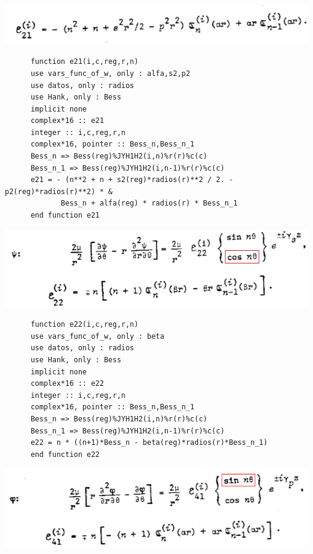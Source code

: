\documentclass [11pt,spanish]{article}
\begin{document}
\includegraphics[scale=0.5]{e21b}
\begingroup
\fontsize{10pt}{12pt}
\selectfont
{}
\begin{shaded}
\begin{verbatim}
      function e21(i,c,reg,r,n)
      use vars_func_of_w, only : alfa,s2,p2
      use datos, only : radios
      use Hank, only : Bess
      implicit none
      complex*16 :: e21
      integer :: i,c,reg,r,n
      complex*16, pointer :: Bess_n,Bess_n_1
      Bess_n => Bess(reg)%JYH1H2(i,n)%r(r)%c(c)
      Bess_n_1 => Bess(reg)%JYH1H2(i,n-1)%r(r)%c(c)
      e21 = - (n**2 + n + s2(reg)*radios(r)**2 / 2. - p2(reg)*radios(r)**2) * &
             Bess_n + alfa(reg) * radios(r) * Bess_n_1
      end function e21
\end{verbatim}
\end{shaded}
\endgroup
\includegraphics[scale=0.5]{e22}
\begingroup
\fontsize{10pt}{12pt}
\selectfont
{}
\begin{shaded}
\begin{verbatim}
      function e22(i,c,reg,r,n)
      use vars_func_of_w, only : beta
      use datos, only : radios
      use Hank, only : Bess
      implicit none
      complex*16 :: e22
      integer :: i,c,reg,r,n
      complex*16, pointer :: Bess_n,Bess_n_1
      Bess_n => Bess(reg)%JYH1H2(i,n)%r(r)%c(c)
      Bess_n_1 => Bess(reg)%JYH1H2(i,n-1)%r(r)%c(c)
      e22 = n * ((n+1)*Bess_n - beta(reg)*radios(r)*Bess_n_1)
      end function e22
\end{verbatim}
\end{shaded}
\endgroup
\includegraphics[scale=0.5]{e41}
\end{document}
